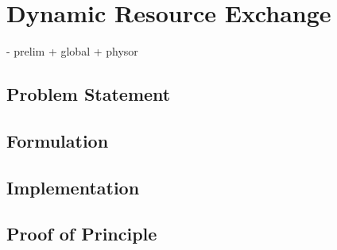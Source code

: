 
\section{Dynamic Resource Exchange}\label{abm:dre}

- prelim + global + physor

\subsection{Problem Statement}

\subsection{Formulation}

\subsection{Implementation}

\subsection{Proof of Principle}

